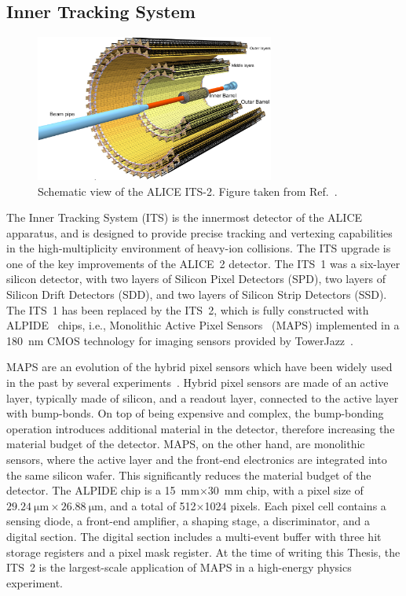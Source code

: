 \subsection{Inner Tracking System}
\begin{figure}[htb]
    \centering
    \includegraphics[width=0.7\textwidth]{Figures/Chapter 3/ITS_Scheme.png}
    \caption{Schematic view of the ALICE ITS-2. Figure taken from Ref.~\cite{ALICE:2023udb}.}
    \label{fig:ITS}
\end{figure}
The Inner Tracking System (ITS) is the innermost detector of the ALICE apparatus, and is designed to provide precise tracking and vertexing capabilities in the high-multiplicity environment of heavy-ion collisions. The ITS upgrade is one of the key improvements of the ALICE~2 detector. The ITS~1 was a six-layer silicon detector, with two layers of Silicon Pixel Detectors (SPD), two layers of Silicon Drift Detectors (SDD), and two layers of Silicon Strip Detectors (SSD). The ITS~1 has been replaced by the ITS~2, which is fully constructed with ALPIDE~\cite{AglieriRinella:2017lym} chips, i.e., Monolithic Active Pixel Sensors~\cite{Snoeys:2014daa} (MAPS) implemented in a 180~nm CMOS technology for imaging sensors provided by TowerJazz~\cite{Senyukov:2013se}.

MAPS are an evolution of the hybrid pixel sensors which have been widely used in the past by several experiments~\cite{ALICE:2008ngc,CMS:1997tlf,Aad:2008zz,Bediaga:2013tje}. Hybrid pixel sensors are made of an active layer, typically made of silicon, and a readout layer, connected to the active layer with bump-bonds. On top of being expensive and complex, the bump-bonding operation introduces additional material in the detector, therefore increasing the material budget of the detector. MAPS, on the other hand, are monolithic sensors, where the active layer and the front-end electronics are integrated into the same silicon wafer. This significantly reduces the material budget of the detector. The ALPIDE chip is a 15~mm$\times$30~mm chip, with a pixel size of $\SI{29.24}{\micro\meter}\times\SI{26.88}{\micro\meter}$, and a total of 512$\times$1024 pixels. Each pixel cell contains a sensing diode, a front-end amplifier, a shaping stage, a discriminator, and a digital section. The digital section includes a multi-event buffer with three hit storage registers and a pixel mask register. At the time of writing this Thesis, the ITS~2 is the largest-scale application of MAPS in a high-energy physics experiment.

